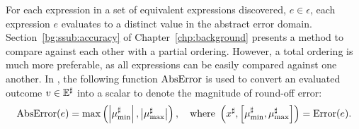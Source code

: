 For each expression in a set of equivalent expressions discovered, $e \in
\epsilon$, each expression $e$ evaluates to a distinct value in the abstract
error domain.  Section~\ref{bg:ssub:accuracy} of Chapter~\ref{chp:background}
presents a method to compare against each other with a partial ordering.
However, a total ordering is much more preferable, as all expressions can
be easily compared against one another.  In \soap, the following function
$\operatorname{\mathrm{AbsError}}$ is used to convert an evaluated outcome $v \in \mathbb{E}^\sharp$ into a
scalar to denote the magnitude of round-off error:
\begin{equation}
    \operatorname{\mathrm{AbsError}}(e) = \max\left(
        \left| \mu^\sharp_{\min} \right|,
        \left| \mu^\sharp_{\max} \right|
    \right),
    \quad \text{where~}
    \left(
        x^\sharp, \left[ \mu^\sharp_{\min}, \mu^\sharp_{\max} \right]
    \right) = \operatorname{\mathrm{Error}}(e).
    \label{so:eq:abserr}
\end{equation}
